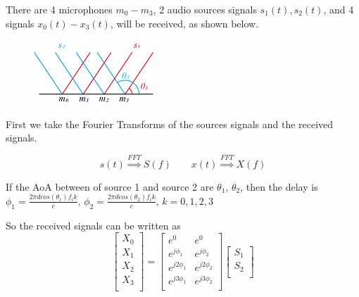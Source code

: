 \documentclass{article}
\begin{document}
        There are 4 microphones $m_0 - m_3$, 2 audio sources signals $s_1(t),s_2(t)$, and 4 signals $x_0(t)-x_3(t)$, will be received, as shown below.

        \begin{figure}[H]
            \centering
            \includegraphics[width = 0.4\textwidth]{pic/pic1.png}
        \end{figure}

        First we take the Fourier Transforms of the sources signals and the received signals.

        $$
        s(t) \stackrel{FFT}{\Longrightarrow} S(f) \qquad x(t) \stackrel{FFT}{\Longrightarrow} X(f)
        $$

        If the AoA between of source 1 and source 2 are $\theta_1 ,\, \theta_2$, then the delay is $\phi_1 = \frac{2\pi d cos(\theta_1)f_ik}{c},\, \phi_2 = \frac{2\pi d cos(\theta_2)f_ik}{c},\, k = 0,1,2,3$
        
        So the received signals can be written as 
        $$
        \left[\begin{matrix}X_0\\X_1\\X_2\\X_3\\\end{matrix}\right]=\left[\begin{matrix}e^0&e^0\\e^{j\phi_1}&e^{j\phi_2}\\e^{j{2\phi}_1}&e^{j{2\phi}_2}\\e^{j{3\phi}_1}&e^{j{3\phi}_2}\\\end{matrix}\right]\left[\begin{matrix}S_1\\S_2\\\end{matrix}\right]
        $$
        
\end{document}

